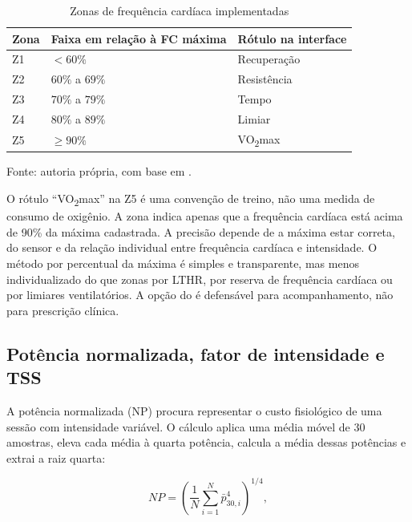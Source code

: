 \begin{table}[htbp]
    \centering
    \caption{Zonas de frequência cardíaca implementadas}
    \label{tab:zonas-fc}
    \small
    \begin{tabular}{@{}>{\raggedright\arraybackslash}p{1.6cm}
        >{\raggedright\arraybackslash}p{4.2cm}
        >{\raggedright\arraybackslash}p{6.8cm}@{}}
        \toprule
        \textbf{Zona} & \textbf{Faixa em relação à FC máxima} & \textbf{Rótulo
        na interface} \\
        \midrule
        Z1 & $< 60\%$ & Recuperação \\
        Z2 & $60\%$ a $69\%$ & Resistência \\
        Z3 & $70\%$ a $79\%$ & Tempo \\
        Z4 & $80\%$ a $89\%$ & Limiar \\
        Z5 & $\geq 90\%$ & VO\textsubscript{2}max \\
        \bottomrule
    \end{tabular}
    \vspace{0.2cm}
    \par\small Fonte: autoria própria, com base em
    .
\end{table}

O rótulo ``VO\textsubscript{2}max'' na Z5 é uma convenção de treino, não uma
medida de consumo de oxigênio. A zona indica apenas que a frequência cardíaca
está acima de 90\% da máxima cadastrada. A precisão depende de a máxima estar
correta, do sensor e da relação individual entre frequência cardíaca e
intensidade. O método por percentual da máxima é simples e transparente, mas
menos individualizado do que zonas por LTHR, por reserva de frequência cardíaca
ou por limiares ventilatórios. A opção do \argus{} é defensável para
acompanhamento, não para prescrição clínica.

\subsection{Potência normalizada, fator de intensidade e TSS}
\label{sec:np-tss}

A potência normalizada (NP) procura representar o custo fisiológico de uma
sessão com intensidade variável. O cálculo aplica uma média móvel de 30
amostras, eleva cada média à quarta potência, calcula a média dessas potências
e extrai a raiz quarta:

\begin{equation}\label{eq:np}
NP = \left(\frac{1}{N}\sum_{i=1}^{N}\bar{p}_{30,i}^{4}\right)^{1/4},
\end{equation}

